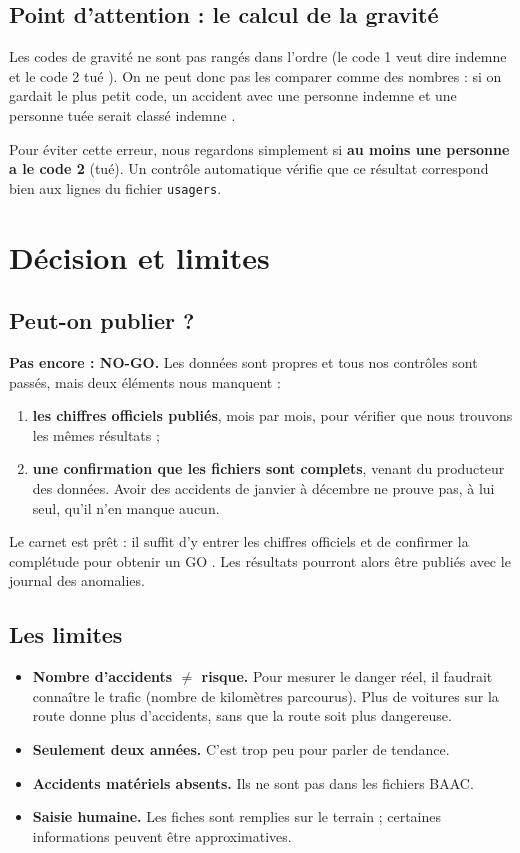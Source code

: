 \documentclass[11pt,a4paper]{article}
\begin{document}
\subsection{Point d'attention : le calcul de la gravité}

Les codes de gravité ne sont pas rangés dans l'ordre (le code 1 veut dire
\og indemne \fg{} et le code 2 \og tué \fg{}). On ne peut donc pas les comparer
comme des nombres : si on gardait le plus petit code, un accident avec une
personne indemne et une personne tuée serait classé \og indemne \fg{}.

Pour éviter cette erreur, nous regardons simplement si \textbf{au moins une
personne a le code 2} (tué). Un contrôle automatique vérifie que ce résultat
correspond bien aux lignes du fichier \texttt{usagers}.

\section{Décision et limites}

\subsection{Peut-on publier ?}

\textbf{Pas encore : NO-GO.} Les données sont propres et tous nos contrôles
sont passés, mais deux éléments nous manquent :
\begin{enumerate}
  \item \textbf{les chiffres officiels publiés}, mois par mois, pour vérifier
        que nous trouvons les mêmes résultats ;
  \item \textbf{une confirmation que les fichiers sont complets}, venant du
        producteur des données. Avoir des accidents de janvier à décembre ne
        prouve pas, à lui seul, qu'il n'en manque aucun.
\end{enumerate}
Le carnet est prêt : il suffit d'y entrer les chiffres officiels et de
confirmer la complétude pour obtenir un \og GO \fg{}. Les résultats pourront
alors être publiés avec le journal des anomalies.

\subsection{Les limites}

\begin{itemize}
  \item \textbf{Nombre d'accidents $\neq$ risque.} Pour mesurer le danger réel,
        il faudrait connaître le trafic (nombre de kilomètres parcourus). Plus
        de voitures sur la route donne plus d'accidents, sans que la route soit
        plus dangereuse.
  \item \textbf{Seulement deux années.} C'est trop peu pour parler de tendance.
  \item \textbf{Accidents matériels absents.} Ils ne sont pas dans les fichiers
        BAAC.
  \item \textbf{Saisie humaine.} Les fiches sont remplies sur le terrain ;
        certaines informations peuvent être approximatives.
\end{itemize}
\end{document}
